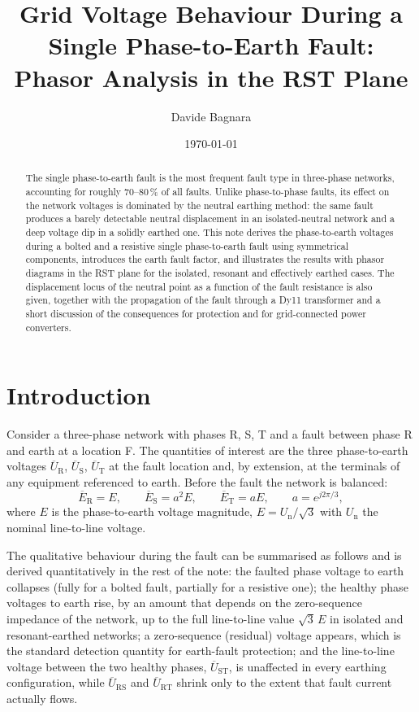 \documentclass[a4paper,11pt]{article}
\title{Grid Voltage Behaviour During a Single Phase-to-Earth Fault:\\
Phasor Analysis in the RST Plane}
\author{Davide Bagnara}
\date{\today}
\newcommand{\ph}[1]{\mathrm{#1}}
\newcommand{\pE}[1]{\overline{E}_{\ph{#1}}}
\newcommand{\pU}[1]{\overline{U}_{\ph{#1}}}
\begin{document}
\maketitle

\begin{abstract}
The single phase-to-earth fault is the most frequent fault type in three-phase
networks, accounting for roughly 70--80\,\% of all faults. Unlike phase-to-phase
faults, its effect on the network voltages is dominated by the neutral earthing
method: the same fault produces a barely detectable neutral displacement in an
isolated-neutral network and a deep voltage dip in a solidly earthed one. This
note derives the phase-to-earth voltages during a bolted and a resistive
single phase-to-earth fault using symmetrical components, introduces the earth
fault factor, and illustrates the results with phasor diagrams in the RST
plane for the isolated, resonant and effectively earthed cases. The
displacement locus of the neutral point as a function of the fault resistance
is also given, together with the propagation of the fault through a Dy11
transformer and a short discussion of the consequences for protection and for
grid-connected power converters.
\end{abstract}

\section{Introduction}
\label{sec:intro}

Consider a three-phase network with phases R, S, T and a fault between phase R
and earth at a location F. The quantities of interest are the three
phase-to-earth voltages $\pU{R}$, $\pU{S}$, $\pU{T}$ at the fault location and,
by extension, at the terminals of any equipment referenced to earth. Before
the fault the network is balanced:
\begin{equation}
\pE{R} = E, \qquad \pE{S} = a^{2}E, \qquad \pE{T} = aE,
\qquad a = e^{j 2\pi/3},
\label{eq:prefault}
\end{equation}
where $E$ is the phase-to-earth voltage magnitude, $E = U_\mathrm{n}/\sqrt{3}$
with $U_\mathrm{n}$ the nominal line-to-line voltage.

The qualitative behaviour during the fault can be summarised as follows and is
derived quantitatively in the rest of the note:
the faulted phase voltage to earth collapses (fully for a bolted fault,
partially for a resistive one); the healthy phase voltages to earth rise, by
an amount that depends on the zero-sequence impedance of the network, up to
the full line-to-line value $\sqrt{3}\,E$ in isolated and resonant-earthed
networks; a zero-sequence (residual) voltage appears, which is the standard
detection quantity for earth-fault protection; and the line-to-line voltage
between the two healthy phases, $\pU{ST}$, is unaffected in every earthing
configuration, while $\pU{RS}$ and $\pU{RT}$ shrink only to the extent that
fault current actually flows.
\end{document}

